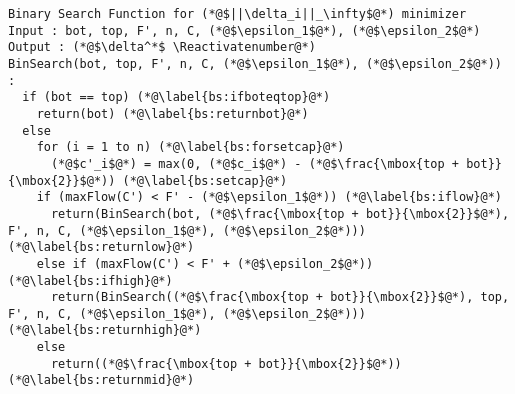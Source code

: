 \Suppressnumber
\begin{lstlisting}[label=binsearch, style=numbers]
Binary Search Function for (*@$||\delta_i||_\infty$@*) minimizer
Input : bot, top, F', n, C, (*@$\epsilon_1$@*), (*@$\epsilon_2$@*)
Output : (*@$\delta^*$ \Reactivatenumber@*)
BinSearch(bot, top, F', n, C, (*@$\epsilon_1$@*), (*@$\epsilon_2$@*)) :
  if (bot == top) (*@\label{bs:ifboteqtop}@*)
    return(bot) (*@\label{bs:returnbot}@*)
  else
    for (i = 1 to n) (*@\label{bs:forsetcap}@*)
      (*@$c'_i$@*) = max(0, (*@$c_i$@*) - (*@$\frac{\mbox{top + bot}}{\mbox{2}}$@*)) (*@\label{bs:setcap}@*)
    if (maxFlow(C') < F' - (*@$\epsilon_1$@*)) (*@\label{bs:iflow}@*)
      return(BinSearch(bot, (*@$\frac{\mbox{top + bot}}{\mbox{2}}$@*), F', n, C, (*@$\epsilon_1$@*), (*@$\epsilon_2$@*))) (*@\label{bs:returnlow}@*)
    else if (maxFlow(C') < F' + (*@$\epsilon_2$@*)) (*@\label{bs:ifhigh}@*)
      return(BinSearch((*@$\frac{\mbox{top + bot}}{\mbox{2}}$@*), top, F', n, C, (*@$\epsilon_1$@*), (*@$\epsilon_2$@*))) (*@\label{bs:returnhigh}@*)
    else
      return((*@$\frac{\mbox{top + bot}}{\mbox{2}}$@*)) (*@\label{bs:returnmid}@*)
\end{lstlisting}
